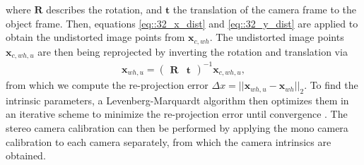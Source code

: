 where $\bm{R}$ describes the rotation, and $\bm{t}$ the translation of the camera frame to the object frame. Then, equations \ref{eq::32_x_dist} and \ref{eq::32_y_dist} are applied to obtain the undistorted image points from $\bm{x}_{c,wh}$. The undistorted image points $\bm{x}_{c,wh,u}$ are then being reprojected by inverting the rotation and translation via
\begin{align}
	\bm{x}_{wh,u} = \begin{pmatrix}
	\bm{R} & \bm{t}
	\end{pmatrix}^{-1}\bm{x}_{c,wh,u},
	\label{eq::32_reprojection}
\end{align}
from which we compute the re-projection error $\Delta x = ||\bm{x}_{wh,u} - \bm{x}_{wh}||_2$. To find the intrinsic parameters, a Levenberg-Marquardt algorithm then optimizes them in an iterative scheme to minimize the re-projection error until convergence \cite{zhang2000flexible}. The stereo camera calibration can then be performed by applying the mono camera calibration to each camera separately, from which the camera intrinsics are obtained. 
